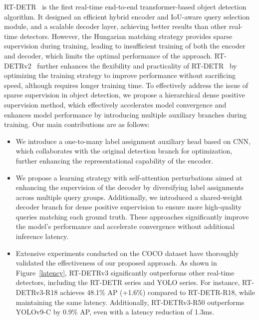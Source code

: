 \documentclass[10pt,twocolumn,letterpaper]{article}
\begin{document}
RT-DETR~\cite{zhao2024rt-detr} is the first real-time end-to-end transformer-based object detection algorithm. It designed an efficient hybrid encoder and IoU-aware query selection module, and a scalable decoder layer, achieving better results than other real-time detectors. However, the Hungarian matching strategy provides sparse supervision during training, leading to insufficient training of both the encoder and decoder, which limits the optimal performance of the approach. RT-DETRv2~\cite{lv2024rt-detrv2} further enhances the flexibility and practicality of RT-DETR~\cite{zhao2024rt-detr} by optimizing the training strategy to improve performance without sacrificing speed, although requires longer training time. 
To effectively address the issue of sparse supervision in object detection, 
we propose a hierarchical dense positive supervision method, which effectively accelerates model convergence and enhances model performance by introducing multiple auxiliary branches during training. Our main contributions are as follows:
\begin{itemize}
    \item We introduce a one-to-many label assignment auxiliary head based on CNN, which collaborates with the original detection branch for optimization, further enhancing the representational capability of the encoder.
    \item We propose a learning strategy with self-attention perturbations aimed at enhancing the supervision of the decoder by diversifying label assignments across multiple query groups. %
    Additionally, we introduced a shared-weight decoder branch for dense positive supervision to ensure more high-quality queries matching each ground truth. These approaches significantly improve the model's performance and accelerate convergence without additional inference latency.
    \item Extensive experiments conducted on the COCO dataset have thoroughly validated the effectiveness of our proposed approach. As shown in Figure~\ref{latency}, RT-DETRv3 significantly outperforms other real-time detectors, including the RT-DETR series and YOLO series. For instance, RT-DETRv3-R18 achieves 48.1\% AP (+1.6\%) compared to RT-DETR-R18, while maintaining the same latency. Additionally, RT-DETRv3-R50 outperforms YOLOv9-C by 0.9\% AP, even with a latency reduction of 1.3ms.
    
\end{itemize}
\end{document}
